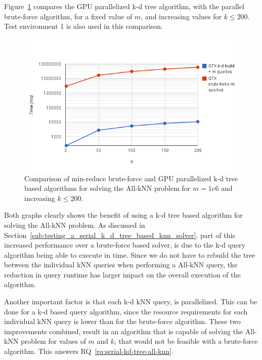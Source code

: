 Figure~\ref{fig:final-var-all-knn-kd-vs-bf} compares the GPU parallelized k-d tree algorithm, with the parallel brute-force algorithm, for a fixed value of $m$, and increasing values for $k\le200$. Test environment 1 is also used in this comparison.

\begin{figure}[ht!]
    \centering
    \includegraphics[width=120mm]{../gfx/final-var-all-knn-kd-vs-bf.png}
    \caption{Comparison of min-reduce brute-force and GPU parallelized k-d tree based algorithms for solving the All-kNN problem for $m=1e6$ and increasing $k\le200$.}
    \label{fig:final-var-all-knn-kd-vs-bf}
\end{figure}

Both graphs clearly shows the benefit of using a k-d tree based algorithm for solving the All-kNN problem. As discussed in Section~\ref{sub:testing_a_serial_k_d_tree_based_knn_solver}, part of this increased performance over a brute-force based solver, is due to the k-d query algorithm being able to execute in  time. Since we do not have to rebuild the tree between the individual kNN queries when performing a All-kNN query, the reduction in query runtime has larger impact on the overall execution of the algorithm.

Another important factor is that each k-d kNN query, is parallelized. This can be done for a k-d based query algorithm, since the resource requirements for each individual kNN query is lower than for the brute-force algorithm. These two improvements combined, result in an algorithm that is capable of solving the All-kNN problem for values of $m$ and $k$, that would not be feasible with a brute-force algorithm. This answers RQ~\ref{rq:serial-kd-tree-all-knn}.

